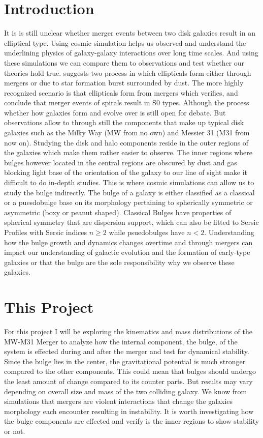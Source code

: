 \documentclass[iop]{emulateapj}
\begin{document}
\section{Introduction}
It is is still unclear whether merger events between two disk galaxies result in an elliptical type. Using cosmic simulation helps us observed and understand the underlining physics of galaxy-galaxy interactions over long time scales. And using these simulations we can compare them to observations and test whether our theories hold true. \citep{zepf1997formation} suggests two process in which ellipticals form either through mergers or due to star formation burst surrounded by dust.  The more highly recognized scenario is that ellipticals form from mergers which \citep{kormendy2009structure} verifies, and \citep{querejeta2015formation} conclude that merger events of spirals result in S0 types. Although the process whether how galaxies form and evolve over is still open for debate. But observations allow to through still the components that make up typical disk galaxies such as the Milky Way (MW from no own) and Messier 31 (M31 from now on). Studying the disk and halo components reside in the outer regions of the galaxies which make them rather easier to observe. The inner regions where bulges however located in the central regions are obscured by dust and gas blocking light base of the orientation of the galaxy to our line of sight make it difficult to do in-depth studies. This is where cosmic simulations can allow us to study the bulge indirectly. The bulge of a galaxy is either classified as a classical or a puesdobulge base on its morphology pertaining to spherically symmetric or asymmetric (boxy or peanut shaped). Classical Bulges have properties of spherical symmetry that are dispersion support, which can also be fitted to Sersic Profiles with Sersic indices $n\geq2$ while psuedobulges have $n<2$. Understanding how the bulge growth and dynamics changes overtime and through mergers can impact our understanding of galactic evolution and the formation of early-type galaxies or that the bulge are the sole responsibility why we observe these galaxies.






\section{This Project}
For this project I will be exploring the kinematics and mass distributions of the MW-M31 Merger to analyze how the internal component, the bulge, of the system is effected during and after the merger and test for dynamical stability.  Since the bulge lies in the center, the gravitational potential is much stronger compared to the other components. This could mean that bulges should undergo the least amount of change compared to its counter parts. But results may vary depending on overall size and mass of the two colliding galaxy. We know from simulations that mergers are violent interactions that change the galaxies morphology each encounter resulting in instability. It is worth investigating how the bulge components are effected and verify is the inner regions to show stability or not. 
\end{document}
